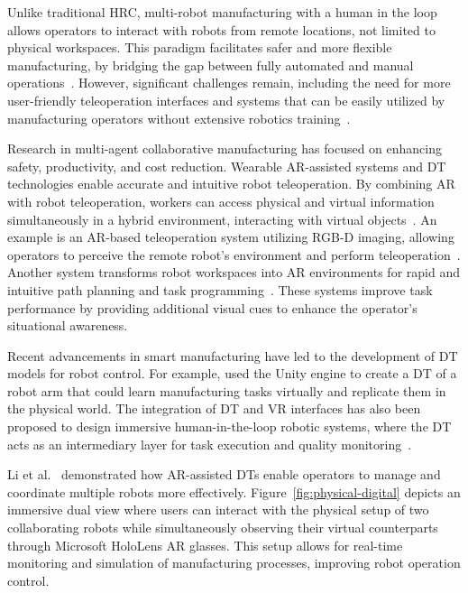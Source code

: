 Unlike traditional \ac{HRC}, multi-robot manufacturing with a human in the loop allows operators to interact with robots from remote locations, not limited to physical workspaces. This paradigm facilitates safer and more flexible manufacturing, by bridging the gap between fully automated and manual operations~\cite{7-ar-dt}. However, significant challenges remain, including the need for more user-friendly teleoperation interfaces and systems that can be easily utilized by manufacturing operators without extensive robotics training~\cite{9-ar-dt}.

Research in multi-agent collaborative manufacturing has focused on enhancing safety, productivity, and cost reduction. Wearable \ac{AR}-assisted systems and \ac{DT} technologies enable accurate and intuitive robot teleoperation. By combining \ac{AR} with robot teleoperation, workers can access physical and virtual information simultaneously in a hybrid environment, interacting with virtual objects~\cite{26-ar-dt,27-ar-dt}. An example is an \ac{AR}-based teleoperation system utilizing RGB-D imaging, allowing operators to perceive the remote robot's environment and perform teleoperation~\cite{10-ar-dt}. Another system transforms robot workspaces into \ac{AR} environments for rapid and intuitive path planning and task programming~\cite{30-ar-dt}. These systems improve task performance by providing additional visual cues to enhance the operator's situational awareness.

Recent advancements in smart manufacturing have led to the development of \ac{DT} models for robot control. For example, \cite{37-ar-dt} used the Unity engine to create a \ac{DT} of a robot arm that could learn manufacturing tasks virtually and replicate them in the physical world. The integration of \ac{DT} and \ac{VR} interfaces has also been proposed to design immersive human-in-the-loop robotic systems, where the \ac{DT} acts as an intermediary layer for task execution and quality monitoring~\cite{41-ar-dt,42-ar-dt}.

Li et al.~\cite{LI2022102321} demonstrated how \ac{AR}-assisted \ac{DTs} enable operators to manage and coordinate multiple robots more effectively.
Figure~\ref{fig:physical-digital} depicts an immersive dual view where users can interact with the physical setup of two collaborating robots while simultaneously observing their virtual counterparts through Microsoft HoloLens \ac{AR} glasses. This setup allows for real-time monitoring and simulation of manufacturing processes, improving robot operation control.

